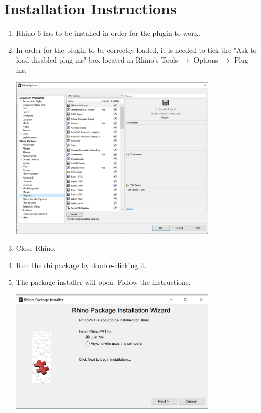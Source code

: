 \section{Installation Instructions}

\begin{enumerate}
    \item Rhino 6 has to be installed in order for the plugin to work.
    \item In order for the plugin to be correctly loaded, it is needed to tick the "Ask to load disabled plug-ins" box located in Rhino's Tools $\rightarrow$ Options $\rightarrow$ Plug-ins.\\
    \begin{minipage}{\linewidth}
        \centering
        \includegraphics[width=10cm]{res/man_install_0}
    \end{minipage}
    \item Close Rhino.
    \item Run the rhi package by double-clicking it.
    \item The package installer will open. Follow the instructions.\\
    \begin{minipage}{\linewidth}
        \centering
        \includegraphics[width=10cm]{res/man_install_1.jpg}

\end{minipage}
\end{enumerate}
